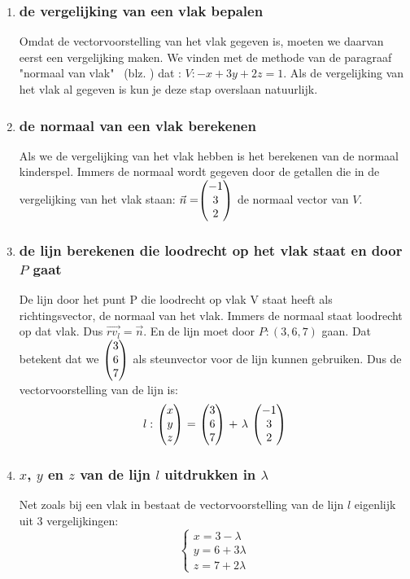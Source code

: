 \begin{enumerate}[label=(\alph*)]
\item \subsubsection{de vergelijking van een vlak bepalen}
Omdat de vectorvoorstelling van het vlak gegeven is, moeten we daarvan eerst een vergelijking maken.
We vinden met de methode van de paragraaf "normaal van vlak" \ 
(blz. \pageref{vlaknormaal}) dat : $ V: -x + 3y +2z = 1 $.  Als de vergelijking van het vlak al gegeven is kun je deze stap overslaan natuurlijk. 

\item \subsubsection{de normaal van een vlak berekenen}
Als we de vergelijking van het vlak hebben is het berekenen van de normaal kinderspel. Immers de normaal wordt gegeven door de getallen die in de vergelijking van het vlak staan:
$ \vec{n} = \vecdrie{-1}{3}{2} $ de normaal vector van $V$.

\item \subsubsection{de lijn berekenen die  loodrecht op het vlak staat  en door $P$ gaat}
De lijn door het punt P die loodrecht op vlak V staat heeft als richtingsvector,  de normaal van het vlak. Immers de normaal staat loodrecht op dat vlak. Dus $\overrightarrow{rv_{l}} = \vec{n}$. En de lijn moet door $P: (3,6,7)$  gaan. Dat  betekent dat we $ \vecdrie{3}{6}{7} $ als steunvector voor de lijn kunnen gebruiken. Dus de vectorvoorstelling van de lijn is: 
\[l:\ \vecdrie{x}{y}{z} \ =\ \vecdrie{3}{6}{7} \ +\ \lambda\ \vecdrie{-1}{3}{2} \]

\item \subsubsection{$x$, $y$ en $z$ van de lijn $l$ uitdrukken in $\lambda$}
Net zoals bij een vlak in \RD bestaat de vectorvoorstelling van de lijn $ l  $ eigenlijk uit 3 vergelijkingen:
\[\begin{cases}
x =  3 -\lambda \\
y =  6 + 3\lambda\\
z = 7 + 2\lambda
\end{cases}
\] 


\end{enumerate}
